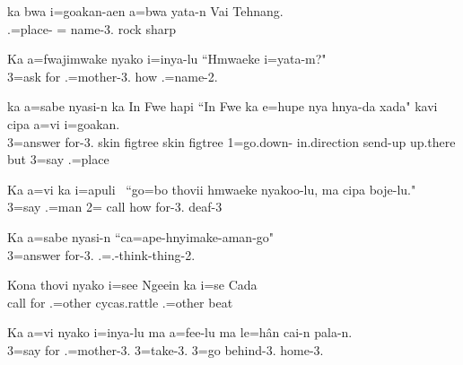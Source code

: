  \ea
 \gll ka bwa i=goakan-aen a=bwa yata-n Vai Tehnang.\\   .=place- = name-3. rock sharp\\ \glt {}
 \z

\ea
\gll Ka a=fwajimwake nyako i=inya-lu ``Hmwaeke i=yata-m?"\\ 
      3=ask for .=mother-3. how .=name-2.\\ 
     \glt {}
\z

\ea
\gll ka a=sabe nyasi-n ka In Fwe hapi ``In Fwe ka e=hupe nya hnya-da xada" kavi cipa a=vi i=goakan.\\  3=answer for-3.  skin figtree  skin figtree  1=go.down- in.direction send-up up.there but  3=say .=place\\ \glt {}
\z

\ea
\gll Ka a=vi ka i=apuli  ``go=bo thovii hmwaeke nyakoo-lu, ma cipa boje-lu."\\ 
      3=say  .=man 2= call how for-3.   deaf-3\\ 
     \glt  {}
\z

\ea
\gll Ka a=sabe nyasi-n ``ca=ape-hnyimake-aman-go"\\  3=answer for-3. .=.-think-thing-2.\\ \glt {}
\z

\ea
\gll Kona thovi nyako i=see Ngeein ka i=se Cada\\  call for .=other cycas.rattle   .=other beat\\ \glt {}
\z

\ea
\gll Ka a=vi nyako i=inya-lu ma a=fee-lu ma le=hân cai-n pala-n.\\  3=say for .=mother-3.  3=take-3.  3=go behind-3. home-3.\\ \glt {}
\z

